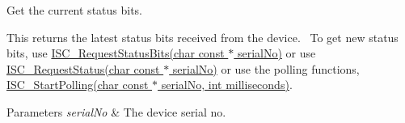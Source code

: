 Get the current status bits. 

This returns the latest status bits received from the device.~\newline
 To get new status bits, use \hyperlink{group___integrated_stepper_motors_ga0eb362f26d17f43ccc7683980ff8f208}{I\+S\+C\+\_\+\+Request\+Status\+Bits(char const $\ast$ serial\+No)} or use \hyperlink{group___integrated_stepper_motors_ga9286789c9718e3129e682409bd1546d2}{I\+S\+C\+\_\+\+Request\+Status(char const $\ast$ serial\+No)} or use the polling functions, \hyperlink{group___integrated_stepper_motors_ga51402e9ecafe804863f4e196816f0de5}{I\+S\+C\+\_\+\+Start\+Polling(char const $\ast$ serial\+No, int milliseconds)}. 


\begin{DoxyParams}{Parameters}
{\em serial\+No} & The device serial no. \\
\hline
\end{DoxyParams}
